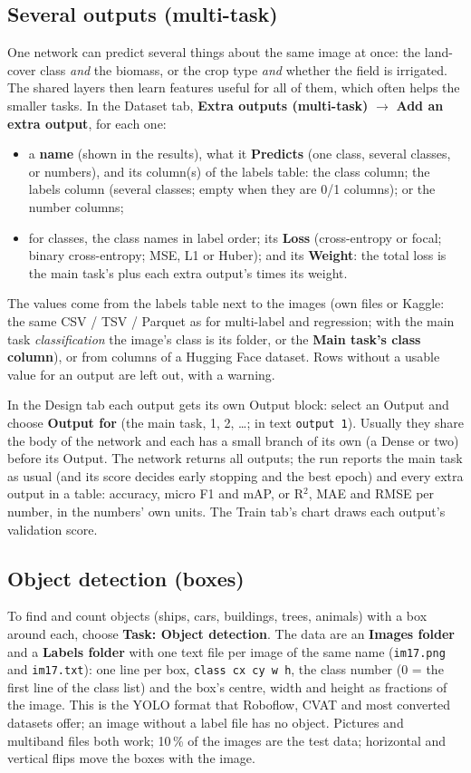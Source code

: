 \documentclass[11pt,a4paper]{article}
\newcommand{\ui}[1]{\textbf{\textsf{#1}}}
\newcommand{\file}[1]{\texttt{#1}}
\begin{document}
\subsection{Several outputs (multi-task)}
\label{sec:multitask}
One network can predict several things about the same image at once: the land-cover class \emph{and} the biomass, or the crop type
\emph{and} whether the field is irrigated. The shared layers then learn features useful for all of them, which often helps the smaller
tasks. In the Dataset tab, \ui{Extra outputs (multi-task)} $\rightarrow$ \ui{Add an extra output}, for each one:
\begin{itemize}[nosep]
  \item a \ui{name} (shown in the results), what it \ui{Predicts} (one class, several classes, or numbers), and its column(s) of the
        labels table: the class column; the labels column (several classes; empty when they are 0/1 columns); or the number columns;
  \item for classes, the class names in label order; its \ui{Loss} (cross-entropy or focal; binary cross-entropy; MSE, L1 or Huber); and
        its \ui{Weight}: the total loss is the main task's plus each extra output's times its weight.
\end{itemize}
The values come from the labels table next to the images (own files or Kaggle: the same CSV / TSV / Parquet as for multi-label and
regression; with the main task \emph{classification} the image's class is its folder, or the \ui{Main task's class column}), or from
columns of a Hugging Face dataset. Rows without a usable value for an output are left out, with a warning.

In the Design tab each output gets its own Output block: select an Output and choose \ui{Output for} (the main task, 1, 2, \dots; in
text \texttt{output 1}). Usually they share the body of the network and each has a small branch of its own (a Dense or two) before its
Output. The network returns all outputs; the run reports the main task as usual (and its score decides early stopping and the best
epoch) and every extra output in a table: accuracy, micro F1 and mAP, or R$^2$, MAE and RMSE per number, in the numbers' own units. The
Train tab's chart draws each output's validation score.

\subsection{Object detection (boxes)}
\label{sec:detection}
To find and count objects (ships, cars, buildings, trees, animals) with a box around each, choose \ui{Task: Object detection}. The data
are an \ui{Images folder} and a \ui{Labels folder} with one text file per image of the same name (\file{im17.png} and \file{im17.txt}):
one line per box, \texttt{class cx cy w h}, the class number (0 = the first line of the class list) and the box's centre, width and
height as fractions of the image. This is the YOLO format that Roboflow, CVAT and most converted datasets offer; an image without a label
file has no object. Pictures and multiband files both work; 10\,\% of the images are the test data; horizontal and vertical flips move
the boxes with the image.
\end{document}
